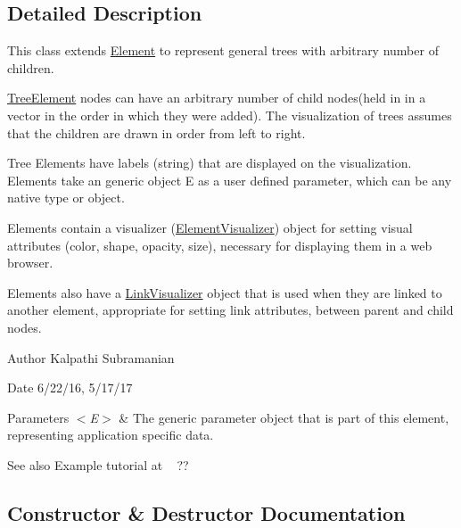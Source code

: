 \subsection{Detailed Description}
This class extends \hyperlink{classbridges_1_1base_1_1_element}{Element} to represent general trees with arbitrary number of children. 

\hyperlink{classbridges_1_1base_1_1_tree_element}{Tree\+Element} nodes can have an arbitrary number of child nodes(held in in a vector in the order in which they were added). The visualization of trees assumes that the children are drawn in order from left to right.

Tree Elements have labels (string) that are displayed on the visualization. Elements take an generic object E as a user defined parameter, which can be any native type or object.

Elements contain a visualizer (\hyperlink{classbridges_1_1base_1_1_element_visualizer}{Element\+Visualizer}) object for setting visual attributes (color, shape, opacity, size), necessary for displaying them in a web browser.

Elements also have a \hyperlink{classbridges_1_1base_1_1_link_visualizer}{Link\+Visualizer} object that is used when they are linked to another element, appropriate for setting link attributes, between parent and child nodes.

\begin{DoxyAuthor}{Author}
Kalpathi Subramanian
\end{DoxyAuthor}
\begin{DoxyDate}{Date}
6/22/16, 5/17/17
\end{DoxyDate}

\begin{DoxyParams}{Parameters}
{\em $<$\+E$>$} & The generic parameter object that is part of this element, representing application specific data.\\
\hline
\end{DoxyParams}
\begin{DoxySeeAlso}{See also}
Example tutorial at ~\newline
 ?? 
\end{DoxySeeAlso}


\subsection{Constructor \& Destructor Documentation}
\hypertarget{classbridges_1_1base_1_1_tree_element_ab1af682e9304f5427e308ba5f43d7a9a}{}\label{classbridges_1_1base_1_1_tree_element_ab1af682e9304f5427e308ba5f43d7a9a} 

